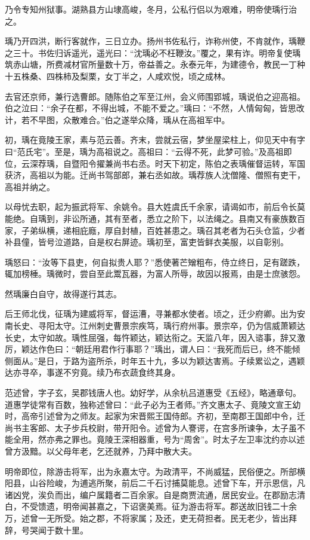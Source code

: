 \documentclass[12pt,UTF8]{ctexbook}
\begin{document}
乃令专知州狱事。湖熟县方山埭高峻，冬月，公私行侣以为艰难，明帝使瑀行治之。

瑀乃开四洪，断行客就作，三日立办。扬州书佐私行，诈称州使，不肯就作，瑀鞭之三十。书佐归诉遥光，遥光曰：“沈瑀必不枉鞭汝。”覆之，果有诈。明帝复使瑀筑赤山塘，所费减材官所量数十万，帝益善之。永泰元年，为建德令，教民一丁种十五株桑、四株柿及梨栗，女丁半之，人咸欢悦，顷之成林。

去官还京师，兼行选曹郎。随陈伯之军至江州，会义师围郢城，瑀说伯之迎高祖。伯之泣曰：“余子在都，不得出城，不能不爱之。”瑀曰：“不然，人情匈匈，皆思改计，若不早图，众散难合。”伯之遂举众降，瑀从在高祖军中。

初，瑀在竟陵王家，素与范云善。齐末，尝就云宿，梦坐屋梁柱上，仰见天中有字曰“范氏宅”。至是，瑀为高祖说之。高祖曰：“云得不死，此梦可验。”及高祖即位，云深荐瑀，自暨阳令擢兼尚书右丞。时天下初定，陈伯之表瑀催督运转，军国获济，高祖以为能。迁尚书驾部郎，兼右丞如故。瑀荐族人沈僧隆、僧照有吏干，高祖并纳之。

以母忧去职，起为振武将军、余姚令。县大姓虞氏千余家，请谒如市，前后令长莫能绝。自瑀到，非讼所通，其有至者，悉立之阶下，以法绳之。县南又有豪族数百家，子弟纵横，递相庇廕，厚自封植，百姓甚患之。瑀召其老者为石头仓监，少者补县僮，皆号泣道路，自是权右屏迹。瑀初至，富吏皆鲜衣美服，以自彰别。

瑀怒曰：“汝等下县吏，何自拟贵人耶？”悉使著芒矰粗布，侍立终日，足有蹉跌，辄加榜棰。瑀微时，尝自至此鬻瓦器，为富人所辱，故因以报焉，由是士庶骇怨。

然瑀廉白自守，故得遂行其志。

后王师北伐，征瑀为建威将军，督运漕，寻兼都水使者。顷之，迁少府卿。出为安南长史、寻阳太守。江州刺史曹景宗疾笃，瑀行府州事。景宗卒，仍为信威萧颖达长史，太守如故。瑀性屈强，每忤颖达，颖达衔之。天监八年，因入谘事，辞又激厉，颖达作色曰：“朝廷用君作行事耶？”瑀出，谓人曰：“我死而后已，终不能倾侧面从。”是日，于路为盗所杀，时年五十九，多以为颖达害焉。子续累讼之，遇颖达亦寻卒，事遂不穷竟。续乃布衣蔬食终其身。

范述曾，字子玄，吴郡钱唐人也。幼好学，从余杭吕道惠受《五经》，略通章句。道惠学徒常有百数，独称述曾曰：“此子必为王者师。”齐文惠太子、竟陵文宣王幼时，高帝引述曾为之师友。起家为宋晋熙王国侍郎。齐初，至南郡王国郎中令，迁尚书主客郎、太子步兵校尉，带开阳令。述曾为人謇谔，在宫多所谏争，太子虽不能全用，然亦弗之罪也。竟陵王深相器重，号为“周舍”。时太子左卫率沈约亦以述曾方汲黯。以父母年老，乞还就养，乃拜中散大夫。

明帝即位，除游击将军，出为永嘉太守。为政清平，不尚威猛，民俗便之。所部横阳县，山谷险峻，为逋逃所聚，前后二千石讨捕莫能息。述曾下车，开示恩信，凡诸凶党，涘负而出，编户属籍者二百余家。自是商贾流通，居民安业。在郡励志清白，不受馈遗，明帝闻甚嘉之，下诏褒美焉。征为游击将军。郡送故旧钱二十余万，述曾一无所受。始之郡，不将家属；及还，吏无荷担者。民无老少，皆出拜辞，号哭闻于数十里。
\end{document}
